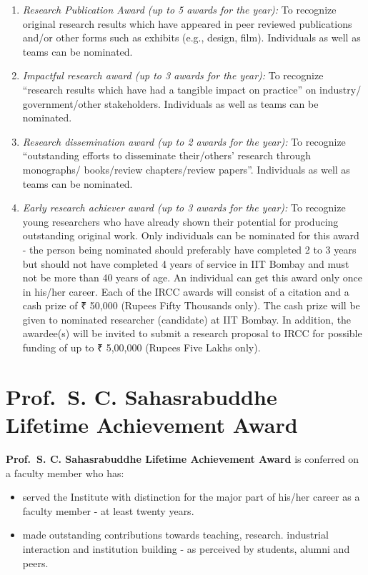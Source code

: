 \documentclass[
  10pt,
  a5paper,
  10pt,
  openany]{amsbook}
\providecommand{\tightlist}{%
  \setlength{\itemsep}{0pt}\setlength{\parskip}{0pt}}
\begin{document}
\begin{enumerate}
\def\labelenumi{\arabic{enumi}.}
\item
  \emph{Research Publication Award (up to 5 awards for the year):} To
  recognize original research results which have appeared in peer
  reviewed publications and/or other forms such as exhibits (e.g.,
  design, film). Individuals as well as teams can be nominated.
\item
  \emph{Impactful research award (up to 3 awards for the year):} To
  recognize ``research results which have had a tangible impact on
  practice'' on industry/ government/other stakeholders. Individuals as
  well as teams can be nominated.
\item
  \emph{Research dissemination award (up to 2 awards for the year):} To
  recognize ``outstanding efforts to disseminate their/others' research
  through monographs/ books/review chapters/review papers''. Individuals
  as well as teams can be nominated.
\item
  \emph{Early research achiever award (up to 3 awards for the year):} To
  recognize young researchers who have already shown their potential for
  producing outstanding original work. Only individuals can be nominated
  for this award - the person being nominated should preferably have
  completed 2 to 3 years but should not have completed 4 years of
  service in IIT Bombay and must not be more than 40 years of age. An
  individual can get this award only once in his/her career. Each of the
  IRCC awards will consist of a citation and a cash prize of ₹ 50,000
  (Rupees Fifty Thousands only). The cash prize will be given to
  nominated researcher (candidate) at IIT Bombay. In addition, the
  awardee(s) will be invited to submit a research proposal to IRCC for
  possible funding of up to ₹ 5,00,000 (Rupees Five Lakhs only).
\end{enumerate}

\section{Prof.~S. C. Sahasrabuddhe Lifetime Achievement
Award}\label{prof.-s.-c.-sahasrabuddhe-lifetime-achievement-award}

\textbf{Prof.~S. C. Sahasrabuddhe Lifetime Achievement Award} is
conferred on a faculty member who has:

\begin{itemize}
\tightlist
\item
  served the Institute with distinction for the major part of his/her
  career as a faculty member - at least twenty years.
\item
  made outstanding contributions towards teaching, research. industrial
  interaction and institution building - as perceived by students,
  alumni and peers.
\end{itemize}
\end{document}
